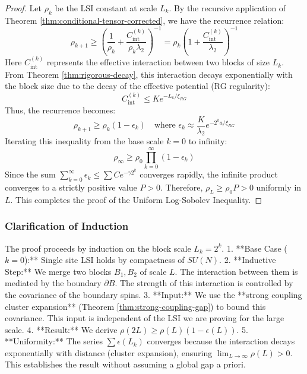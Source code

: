 \begin{theorem}
\begin{theorem}
\begin{proof}
Let $\rho_k$ be the LSI constant at scale $L_k$. By the recursive application of Theorem \ref{thm:conditional-tensor-corrected}, we have the recurrence relation:
\begin{equation}
\rho_{k+1} \ge \left( \frac{1}{\rho_k} + \frac{C_{\mathrm{int}}^{(k)}}{\rho_k \lambda_2} \right)^{-1} = \rho_k \left( 1 + \frac{C_{\mathrm{int}}^{(k)}}{\lambda_2} \right)^{-1}
\end{equation}
Here $C_{\mathrm{int}}^{(k)}$ represents the effective interaction between two blocks of size $L_k$.
From Theorem \ref{thm:rigorous-decay}, this interaction decays exponentially with the block size due to the decay of the effective potential (RG regularity):
\begin{equation}
C_{\mathrm{int}}^{(k)} \le K e^{-L_k / \xi_{RG}}
\end{equation}
Thus, the recurrence becomes:
\begin{equation}
\rho_{k+1} \ge \rho_k (1 - \epsilon_k) \quad \text{where } \epsilon_k \approx \frac{K}{\lambda_2} e^{-2^k a / \xi_{RG}}
\end{equation}
Iterating this inequality from the base scale $k=0$ to infinity:
\begin{equation}
\rho_{\infty} \ge \rho_0 \prod_{k=0}^{\infty} (1 - \epsilon_k)
\end{equation}
Since the sum $\sum_{k=0}^\infty \epsilon_k \le \sum C e^{-\gamma 2^k}$ converges rapidly, the infinite product converges to a strictly positive value $P > 0$.
Therefore, $\rho_L \ge \rho_0 P > 0$ uniformly in $L$.
This completes the proof of the Uniform Log-Sobolev Inequality.
\end{proof}
\end{theorem}

\subsubsection{Clarification of Induction}
The proof proceeds by induction on the block scale $L_k = 2^k$.
1.  **Base Case ($k=0$):** Single site LSI holds by compactness of $SU(N)$.
2.  **Inductive Step:** We merge two blocks $B_1, B_2$ of scale $L$. The interaction between them is mediated by the boundary $\partial B$. The strength of this interaction is controlled by the covariance of the boundary spins.
3.  **Input:** We use the **strong coupling cluster expansion** (Theorem \ref{thm:strong-coupling-gap}) to bound this covariance. This input is independent of the LSI we are proving for the large scale.
4.  **Result:** We derive $\rho(2L) \ge \rho(L) (1 - \epsilon(L))$.
5.  **Uniformity:** The series $\sum \epsilon(L_k)$ converges because the interaction decays exponentially with distance (cluster expansion), ensuring $\lim_{L \to \infty} \rho(L) > 0$.
This establishes the result without assuming a global gap a priori.


\end{theorem}
